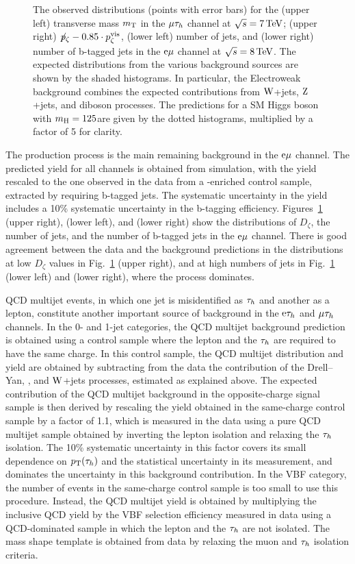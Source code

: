 \documentclass[12pt,twoside,a4paper,cmspaper,final,collab]{cms-tdr}
\begin{document}
\begin{figure}[t!]
\caption{The observed distributions (points with error bars) for the (upper left) transverse mass $m_\mathrm{T}$ in the ${\mu}\tau_h$ channel at $\sqrt{s}=7\,\text{Te\hspace{-.08em}V}$;
(upper right) $\not\! p_\zeta- 0.85 \cdot p_\zeta^{\mathrm{vis}}$, (lower left) number of jets, and (lower right) number of b-tagged jets in the $\mathrm{e}{\mu}$ channel at $\sqrt{s}=8\,\text{Te\hspace{-.08em}V}$.
The expected distributions from the various background sources are shown by the shaded histograms.
In particular, the Electroweak background combines the expected contributions from $\mathrm{W}$+jets, $\mathrm{Z}$+jets, and diboson processes.
The predictions for a SM Higgs boson with $m_{\mathrm{H}}=125$\GeV are given by the dotted histograms, multiplied by a factor of 5 for clarity.}
\label{fig:htt_control}
\end{figure}

The \ttbar production process is the main remaining background in the $\mathrm{e}{\mu}$ channel.
The predicted yield for all channels is obtained from simulation, with the yield rescaled to the one observed in the data from
a \ttbar-enriched control sample, extracted by requiring b-tagged jets.
The systematic uncertainty in the yield includes a 10\% systematic uncertainty in the b-tagging efficiency.
Figures~\ref{fig:htt_control} (upper right), (lower left), and (lower right) show the distributions of $D_\zeta$, the number of jets, and
the number of b-tagged jets in the $\mathrm{e}{\mu}$ channel.
There is good agreement between the data and the background predictions in the distributions at
low $D_\zeta$ values in Fig.~\ref{fig:htt_control} (upper right), and at high numbers of jets in
Fig.~\ref{fig:htt_control} (lower left) and (lower right), where the \ttbar process dominates.

QCD multijet events, in which one jet is misidentified as $\tau_h$ and another as a lepton, constitute another important source
of background in the $\mathrm{e}\tau_h$ and  ${\mu}\tau_h$ channels.
In the 0- and 1-jet categories, the QCD multijet background prediction is obtained using a control sample where the
lepton and the $\tau_h$ are required to have the same charge.
In this control sample, the QCD multijet distribution and yield are obtained by subtracting from the data the contribution of the Drell--Yan, \ttbar,
and $\mathrm{W}$+jets processes, estimated as explained above.
The expected contribution of the QCD multijet background in the opposite-charge signal sample is then derived by rescaling the yield obtained in the same-charge control sample by a factor of 1.1,
which is measured in the data using a pure QCD multijet sample obtained by inverting the lepton isolation
and relaxing the $\tau_h$ isolation.
The 10\% systematic uncertainty in this factor covers its small dependence on $p_{\mathrm{T}}(\tau_h)$ and the statistical uncertainty in its measurement, and dominates the uncertainty in this background contribution.
In the VBF category, the number of events in the same-charge control sample is too small to use this procedure.
Instead, the QCD multijet yield is obtained by multiplying the inclusive QCD yield
by the VBF selection efficiency measured in  data using a QCD-dominated sample in which the lepton and the $\tau_h$ are not isolated.
The mass shape template is obtained from data by relaxing the muon and $\tau_h$ isolation criteria.
\end{document}
